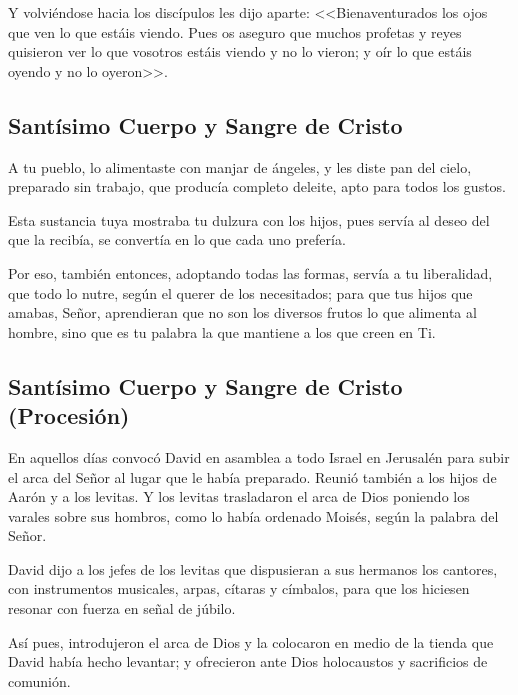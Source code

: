 Y 
volviéndose hacia los discípulos les dijo 
aparte: <<Bienaventurados los ojos que ven lo 
que estáis viendo. Pues os aseguro que 
muchos profetas y reyes quisieron ver lo que 
vosotros estáis viendo y no lo vieron; y oír lo 
que estáis oyendo y no lo oyeron>>. 


\subsection{Santísimo Cuerpo y Sangre de Cristo}



 A tu pueblo, lo alimentaste con manjar de 
ángeles, y les diste pan del cielo, preparado sin 
trabajo, que producía completo deleite, apto 
para todos los gustos. 

Esta sustancia tuya 
mostraba tu dulzura con los hijos, pues servía 
al deseo del que la recibía, se convertía en lo 
que cada uno prefería.  

Por eso, también 
entonces, adoptando todas las formas, servía a 
tu liberalidad, que todo lo nutre, según el 
querer de los necesitados; para que tus hijos 
que amabas, Señor, aprendieran que no son los 
diversos frutos lo que alimenta al hombre, sino 
que es tu palabra la que mantiene a los que 
creen en Ti. 


\subsection*{Santísimo Cuerpo y Sangre de Cristo (Procesión)}


 En aquellos días convocó David en asamblea 
a todo Israel en Jerusalén para subir el arca del 
Señor al lugar que le había preparado. Reunió 
también a los hijos de Aarón y a los levitas. Y 
los levitas trasladaron el arca de Dios 
poniendo los varales sobre sus hombros, como 
lo había ordenado Moisés, según la palabra del 
Señor. 

 David dijo a los jefes de los levitas que 
dispusieran a sus hermanos los cantores, con 
instrumentos musicales, arpas, cítaras y 
címbalos, para que los hiciesen resonar con 
fuerza en señal de júbilo.  

Así pues, 
introdujeron el arca de Dios y la colocaron en 
medio de la tienda que David había hecho 
levantar; y ofrecieron ante Dios holocaustos y 
sacrificios de comunión. 


